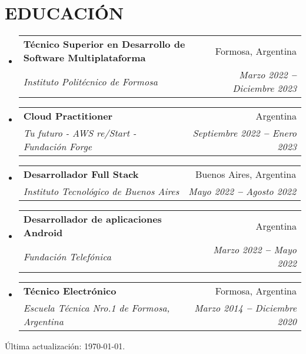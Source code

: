 \documentclass[letterpaper,11pt]{article}
\makeatletter
\newcommand{\resumeItem}[1]{
  \item\small{
    {#1 \vspace{-2pt}}
  }
}
\newcommand{\resumeSubheading}[4]{
  \vspace{-2pt}\item
    \begin{tabular*}{0.97\textwidth}[t]{l@{\extracolsep{\fill}}r}
      \textbf{#1} & #2 \\
      \textit{\small#3} & \textit{\small #4} \\
    \end{tabular*}\vspace{-7pt}
}
\newcommand{\resumeSubHeadingListStart}{\begin{itemize}[leftmargin=0.15in, label={}]}
\newcommand{\resumeSubHeadingListEnd}{\end{itemize}}
\newcommand{\resumeItemListStart}{\begin{itemize}}
\newcommand{\resumeItemListEnd}{\end{itemize}\vspace{-5pt}}
\makeatother
\begin{document}

\section{EDUCACIÓN}
\vspace{3pt}
\resumeSubHeadingListStart
\resumeSubheading
{Técnico Superior en Desarrollo de Software Multiplataforma
}{Formosa, Argentina}
{Instituto Politécnico de Formosa}{Marzo 2022 \textbf{--} Diciembre 2023}
\resumeSubheading
{Cloud Practitioner
}{Argentina}
{Tu futuro - AWS re/Start - Fundación Forge}{Septiembre 2022 \textbf{--} Enero 2023}
\resumeSubheading
{Desarrollador Full Stack
}{Buenos Aires, Argentina}
{Instituto Tecnológico de Buenos Aires}{Mayo 2022 \textbf{--} Agosto 2022}
\resumeSubheading
{Desarrollador de aplicaciones Android
}{Argentina}
{Fundación Telefónica}{Marzo 2022 \textbf{--} Mayo 2022}
\resumeSubheading
{Técnico Electrónico
}{Formosa, Argentina}
{Escuela Técnica Nro.1 de Formosa, Argentina}{Marzo 2014 \textbf{--} Diciembre 2020}
\resumeSubHeadingListEnd

\raggedleft 
Última actualización: \today.



\end{document}
